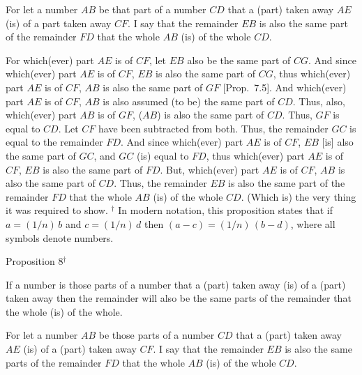 For let a number $AB$ be that part of a number $CD$  that a (part) taken away $AE$ (is) of a part taken away $CF$. I say that the remainder $EB$ is also the
same part of the remainder $FD$ that the whole $AB$ (is) of the whole $CD$.

For which(ever) part $AE$ is of $CF$, let $EB$ also be the same part of $CG$.
And since which(ever) part $AE$ is of $CF$, $EB$ is also the same part
of $CG$, thus which(ever) part $AE$ is of $CF$, $AB$ is also the same part of
$GF$ [Prop.~7.5]. And which(ever) part $AE$ is of $CF$, $AB$ is also assumed (to be)
the same part of $CD$. Thus, also, which(ever) part $AB$ is of $GF$, ($AB$) is also
the same part of $CD$. Thus, $GF$ is equal to $CD$. Let $CF$ have been subtracted from
both. Thus, the remainder $GC$ is equal to the remainder $FD$. And since
which(ever) part $AE$ is of $CF$, $EB$ [is] also the same part of $GC$, and $GC$ (is)
equal to $FD$, thus which(ever) part $AE$ is of $CF$, $EB$ is also the same part of
$FD$.
 But, 
which(ever) part $AE$ is of $CF$, $AB$ is also the same part of $CD$. Thus, the
remainder $EB$ is also the same part of the remainder $FD$ that
the whole $AB$ (is) of the whole $CD$. (Which is) the very thing it
was required to show.
{\footnotesize \noindent$^\dag$ In modern notation, this
proposition states that if $a=(1/n)\,b$ and $c=(1/n)\,d$ then $(a-c)=
(1/n)\,(b-d)$, where all symbols denote numbers.}


\begin{center}
{\large Proposition 8}$^\dag$
\end{center}

If  a number is those parts of a number that a
(part) taken away (is) of a (part) taken away then the remainder will also be
the same parts of the remainder that the whole (is) of the whole.

\epsfysize=1.4in
\centerline{}

For let a number $AB$ be those parts of a number $CD$ that a
(part) taken away $AE$ (is) of a (part) taken away $CF$. I say that the remainder
$EB$ is also the same parts of the remainder $FD$ that the whole $AB$ (is) of the
whole $CD$.

